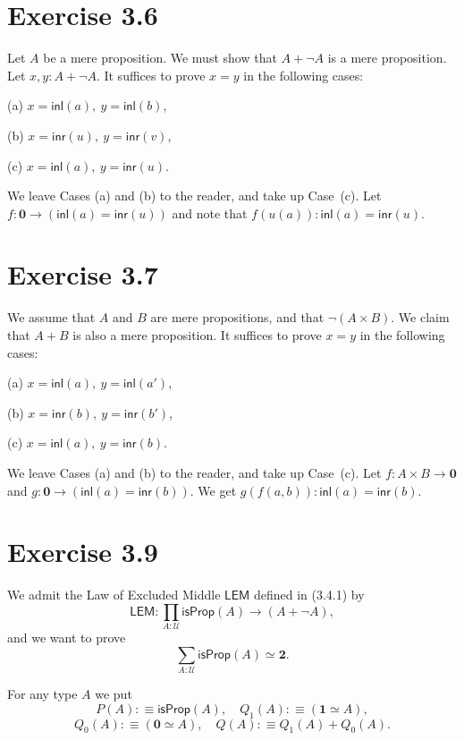 \documentclass[12pt]{article}
\newcommand{\mbf}{\mathbf}
\newcommand{\msf}{\mathsf}
\newcommand{\nn}{\noindent}
\newcommand{\U}{\mathcal U}
\begin{document}

\section{Exercise 3.6}

Let $A$ be a mere proposition. We must show that $A+\neg A$ is a mere proposition. Let $x,y:A+\neg A$. It suffices to prove $x=y$ in the following cases:

(a) $x=\msf{inl}(a),\ y=\msf{inl}(b)$,

(b) $x=\msf{inr}(u),\ y=\msf{inr}(v)$,

(c) $x=\msf{inl}(a),\ y=\msf{inr}(u)$.

\nn We leave Cases (a) and (b) to the reader, and take up Case~(c). Let $f:\mbf0\to(\msf{inl}(a)=\msf{inr}(u))$ and note that $f(u(a)):\msf{inl}(a)=\msf{inr}(u)$.


\section{Exercise 3.7}

We assume that $A$ and $B$ are mere propositions, and that $\neg(A\times B)$. We claim that $A+B$ is also a mere proposition. It suffices to prove $x=y$ in the following cases:

(a) $x=\msf{inl}(a),\ y=\msf{inl}(a')$,

(b) $x=\msf{inr}(b),\ y=\msf{inr}(b')$,

(c) $x=\msf{inl}(a),\ y=\msf{inr}(b)$.

\nn We leave Cases (a) and (b) to the reader, and take up Case~(c). Let $f:A\times B\to\mbf0$ and $g:\mbf0\to(\msf{inl}(a)=\msf{inr}(b))$. We get $g(f(a,b)):\msf{inl}(a)=\msf{inr}(b)$.


\section{Exercise 3.9}

We admit the Law of Excluded Middle $\msf{LEM}$ defined in (3.4.1) by 
$$
\msf{LEM}:\prod_{A:\U}\msf{isProp}(A)\to(A+\neg A),
$$ 
and we want to prove 
\begin{equation}\label{e39}
\sum_{A:\U}\msf{isProp}(A)\simeq\mbf2.
\end{equation}

For any type $A$ we put 
$$
P(A):\equiv\msf{isProp}(A),\quad Q_1(A):\equiv(\mbf1\simeq A),
$$
$$
Q_0(A):\equiv(\mbf0\simeq A),\quad Q(A):\equiv Q_1(A)+Q_0(A).
$$ 
\end{document}
